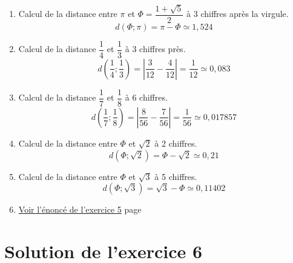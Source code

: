 \documentclass[a4paper,11pt]{book}
\begin{document}
\begin{enumerate}
\item Calcul de la distance entre \(\pi\) et \(\Phi = \dfrac{1 +
   \sqrt{5}}{2}\) à 3 chiffres après la virgule.
\[d(\Phi ; \pi) = \pi - \Phi \simeq 1,524\]
\item Calcul de la distance \(\dfrac{1}{4}\) et \(\dfrac{1}{3}\) à 3
chiffres près.
\[d\left(\dfrac{1}{4} ; \dfrac{1}{3}\right) =
       \left\lvert\dfrac{3}{12} - \dfrac{4}{12}\right\rvert =
       \dfrac{1}{12} \simeq 0,083\]
\item Calcul de la distance \(\dfrac{1}{7}\) et \(\dfrac{1}{8}\) à 6 chiffres.
\[d\left(\dfrac{1}{7} ; \dfrac{1}{8}\right) =
       \left\lvert\dfrac{8}{56} - \dfrac{7}{56}\right\rvert =
       \dfrac{1}{56} \simeq 0,017857\]
\item Calcul de la distance entre \(\Phi\) et \(\sqrt{2}\) à 2 chiffres.
\[d\left(\Phi ; \sqrt{2}\right) = \Phi - \sqrt{2} \simeq 0,21\]
\item Calcul de la distance entre \(\Phi\) et \(\sqrt{3}\) à 5 chiffres.
\[d\left(\Phi ; \sqrt{3}\right) = \sqrt{3} - \Phi \simeq 0,11402\]

\item \hyperref[org65c295d]{Voir l'énoncé de l'exercice 5}
page~\pageref{page:sec2.3.2exo5}
\end{enumerate}

\clearpage

\section{Solution de l'exercice 6}
\label{sec:org93888f6}
\label{orge0c2cd7}
\label{page:sec8.3.2sol6}
\end{document}
